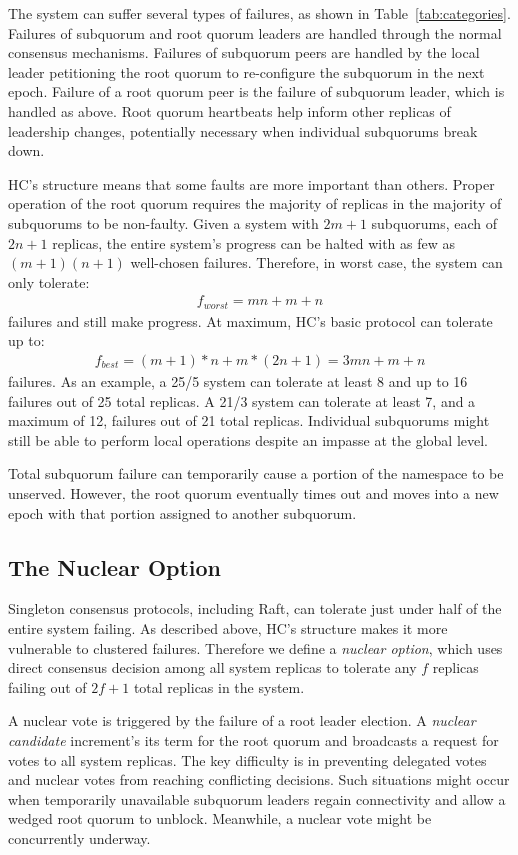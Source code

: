 \documentclass[11pt,conference]{IEEEtran}
\newcommand{\sub}{subquorum\xspace}
\newcommand{\subs}{subquorums\xspace}
\newcommand{\roo}{root quorum\xspace}
\newcommand{\Roo}{Root quorum\xspace}
\begin{document}
The system can suffer several types of failures, as shown in
Table~\ref{tab:categories}.
Failures of \sub and \roo leaders are handled through the normal consensus
mechanisms.
Failures of \sub peers are handled by the local leader petitioning the \roo to
re-configure the \sub in the next epoch.
Failure of a \roo peer is the failure of \sub leader, which is handled as
above.
\Roo heartbeats help inform other replicas of leadership changes, potentially
necessary when individual \subs break down.

HC's structure means that some faults are more important than others.
Proper operation of the \roo requires the majority of replicas in the majority of \subs to
be non-faulty.
Given a system with $2m+1$ \subs, each of $2n+1$ replicas, the entire
system's progress can be halted with as few as $(m+1)(n+1)$ well-chosen
failures.
Therefore, in worst case, the system can only tolerate:
\begin{align*}
f_{worst}=mn+m+n
\end{align*}
failures and still make progress.
At maximum, HC's basic protocol can tolerate up to:
\begin{align*}
f_{best} = (m+1)*n + m*(2n+1) = 3mn+m+n
\end{align*}
failures.
As an example, a 25/5 system can tolerate at least 8 and
up to 16 failures out of 25 total replicas.
A 21/3 system can tolerate at least 7, and a maximum of 12,
failures out of 21 total replicas.
Individual \subs might
still be able to perform local operations despite an impasse at the global level.

Total \sub failure can temporarily cause a portion of the namespace to be unserved. However, the \roo
eventually times out and moves into a new epoch with that portion assigned to another
\sub.

\subsection{The Nuclear Option}
Singleton consensus protocols, including Raft, can tolerate just under half of the entire system
failing.
As described above, HC's structure makes it more vulnerable to clustered failures.
Therefore we define a \emph{nuclear option}, which uses direct consensus
decision among all system replicas to tolerate any $f$ replicas
failing out of $2f+1$ total replicas in the system.

A nuclear vote is triggered by the failure of a root leader election.
A \emph{nuclear candidate}
increment's its term for the \roo and broadcasts a request for votes to all
system replicas.
The key difficulty is in preventing delegated votes and
nuclear votes from reaching conflicting decisions.
Such situations might occur when temporarily unavailable \sub leaders regain connectivity
and allow a wedged \roo to unblock.
Meanwhile, a nuclear vote might be concurrently underway.
\end{document}

